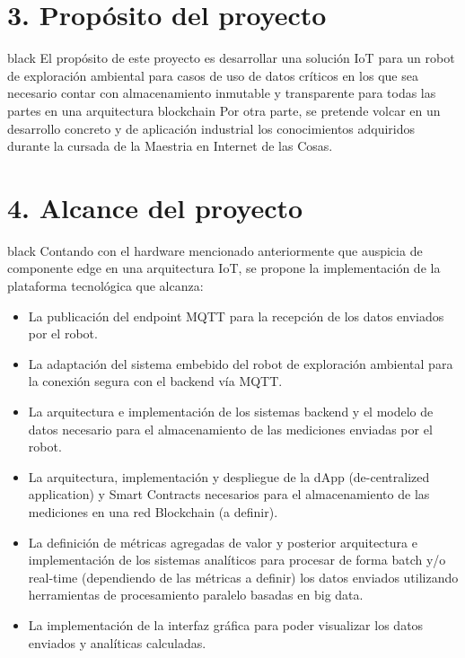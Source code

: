 \documentclass[
11pt, %
]{charter}
\begin{document}
\section{3. Propósito del proyecto}
\label{sec:proposito}

\begin{consigna}{black}
El propósito de este proyecto es desarrollar una solución IoT para un robot de exploración ambiental para casos de uso de datos críticos en los que sea necesario contar con almacenamiento inmutable y transparente para todas las partes en una arquitectura blockchain 
Por otra parte, se pretende volcar en un desarrollo concreto y de aplicación industrial los conocimientos adquiridos durante la cursada de la Maestria en Internet de las Cosas.

\end{consigna}

\section{4. Alcance del proyecto}
\label{sec:alcance}

\begin{consigna}{black}
Contando con el hardware mencionado anteriormente que auspicia de componente edge en una arquitectura IoT, se propone la implementación de la plataforma tecnológica que alcanza:

\begin{itemize}
	\item La publicación del endpoint MQTT para la recepción de los datos enviados por el robot.
	\item La adaptación del sistema embebido del robot de exploración ambiental para la conexión segura con el backend vía MQTT.
	\item La arquitectura e implementación de los sistemas backend y el modelo de datos necesario para el almacenamiento de las mediciones enviadas por el robot.
	\item La arquitectura, implementación y despliegue de la dApp (de-centralized application) y Smart Contracts necesarios para el almacenamiento de las mediciones en una red Blockchain (a definir).
	\item La definición de métricas agregadas de valor y posterior arquitectura e implementación de los sistemas analíticos para procesar de forma batch y/o real-time (dependiendo de las métricas a definir) los datos enviados utilizando herramientas de procesamiento paralelo basadas en big data.
	\item La implementación de la interfaz gráfica para poder visualizar los datos enviados y analíticas calculadas.

\end{itemize}


\end{consigna}
\end{document}
